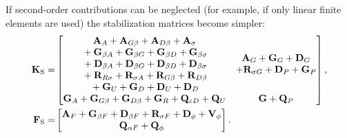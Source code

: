 \endgroup
If second-order contributions can be neglected (for example, if only linear finite elements are used) the stabilization matrices become simpler:
\begin{align} \label{eq:FirstOrdertabilizationMatrices}
  \mathbf{K}_{\mathrm{S}} = &
  \begin{bmatrix}
    \begin{matrix}
      \mathbf{A}_A + \mathbf{A}_{G\beta} + \mathbf{A}_{D\beta} + \mathbf{A}_\sigma                                             \\
      \vphantom{\mathbf{A}_A} + \mathbf{G}_{\beta A} + \mathbf{G}_{\beta G} + \mathbf{G}_{\beta D} + \mathbf{G}_{\beta \sigma} \\
      \vphantom{\mathbf{A}_A} + \mathbf{D}_{\beta A} + \mathbf{D}_{\beta G} + \mathbf{D}_{\beta D} + \mathbf{D}_{\beta \sigma} \\
      \vphantom{\mathbf{A}_A} + \mathbf{R}_{R\sigma} + \mathbf{R}_{\sigma A} + \mathbf{R}_{G\beta} + \mathbf{R}_{D\beta}       \\
      \vphantom{\mathbf{A}_A} + \mathbf{G}_U + \mathbf{G}_{D} + \mathbf{D}_{U} + \mathbf{D}_{D}
    \end{matrix} &
    \begin{matrix}
      \mathbf{A}_G + \mathbf{G}_G + \mathbf{D}_G \\ +\mathbf{R}_{\sigma G}  + \mathbf{D}_P + \mathbf{G}_P \\
    \end{matrix}                                                                  \\
    \mathbf{G}_A + \mathbf{G}_{G \beta} + \mathbf{G}_{D \beta} + \mathbf{G}_R  + \mathbf{Q}_{\varepsilon D} + \mathbf{Q}_U                   & \mathbf{G} + \mathbf{Q}_P
  \end{bmatrix}, \\
  \mathbf{F}_{\mathrm{S}} = &
  \begin{bmatrix}
    \mathbf{A}_F + \mathbf{G}_{\beta F} + \mathbf{D}_{\beta F} + \mathbf{R}_{\sigma F} + \mathbf{D}_{\phi} + \mathbf{V}_{\phi} \\
    \mathbf{Q}_{\alpha F} + \mathbf{Q}_{\phi}
  \end{bmatrix}.
\end{align}
